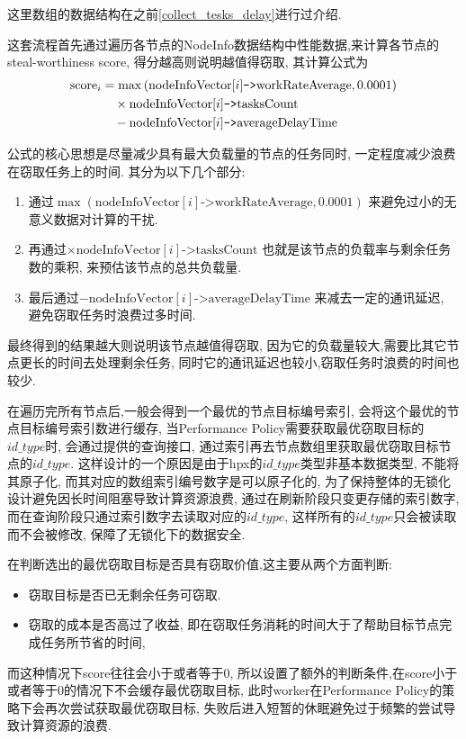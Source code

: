 \documentclass{mproj}
\begin{document}
这里数组的数据结构在之前\cref{collect_tesks_delay}进行过介绍.

这套流程首先通过遍历各节点的NodeInfo数据结构中性能数据,来计算各节点的steal-worthiness score,
得分越高则说明越值得窃取,
其计算公式为
\begin{align}
    \text{score}_i & = \max\left(\text{nodeInfoVector}[i]\texttt{->}\text{workRateAverage}, 0.0001 \right) \notag \\
                   & \quad\times \text{nodeInfoVector}[i]\texttt{->}\text{tasksCount} \notag                      \\
                   & \quad - \text{nodeInfoVector}[i]\texttt{->}\text{averageDelayTime} \label{eq:score}
\end{align}

公式的核心思想是尽量减少具有最大负载量的节点的任务同时,
一定程度减少浪费在窃取任务上的时间.
其分为以下几个部分:
\begin{enumerate}
    \item 通过$\max\left(\text{nodeInfoVector}[i]\texttt{->}\text{workRateAverage}, 0.0001 \right)$
          来避免过小的无意义数据对计算的干扰.
    \item 再通过$\times \text{nodeInfoVector}[i]\texttt{->}\text{tasksCount}$
          也就是该节点的负载率与剩余任务数的乘积,
          来预估该节点的总共负载量.
    \item 最后通过$- \text{nodeInfoVector}[i]\texttt{->}\text{averageDelayTime}$
          来减去一定的通讯延迟,
          避免窃取任务时浪费过多时间.
\end{enumerate}

最终得到的结果越大则说明该节点越值得窃取,
因为它的负载量较大,需要比其它节点更长的时间去处理剩余任务,
同时它的通讯延迟也较小,窃取任务时浪费的时间也较少.

在遍历完所有节点后,一般会得到一个最优的节点目标编号索引,
会将这个最优的节点目标编号索引数进行缓存,
当Performance Policy需要获取最优窃取目标的$id\_type$时,
会通过提供的查询接口,
通过索引再去节点数组里获取最优窃取目标节点的$id\_type$.
这样设计的一个原因是由于hpx的$id\_type$类型非基本数据类型,
不能将其原子化,
而其对应的数组索引编号数字是可以原子化的,
为了保持整体的无锁化设计避免因长时间阻塞导致计算资源浪费,
通过在刷新阶段只变更存储的索引数字,
而在查询阶段只通过索引数字去读取对应的$id\_type$,
这样所有的$id\_type$只会被读取而不会被修改,
保障了无锁化下的数据安全.

在判断选出的最优窃取目标是否具有窃取价值,这主要从两个方面判断:
\begin{itemize}
    \item 窃取目标是否已无剩余任务可窃取.
    \item 窃取的成本是否高过了收益,
          即在窃取任务消耗的时间大于了帮助目标节点完成任务所节省的时间,
\end{itemize}
而这种情况下score往往会小于或者等于0,
所以设置了额外的判断条件,在score小于或者等于0的情况下不会缓存最优窃取目标,
此时worker在Performance Policy的策略下会再次尝试获取最优窃取目标,
失败后进入短暂的休眠避免过于频繁的尝试导致计算资源的浪费.
\end{document}
